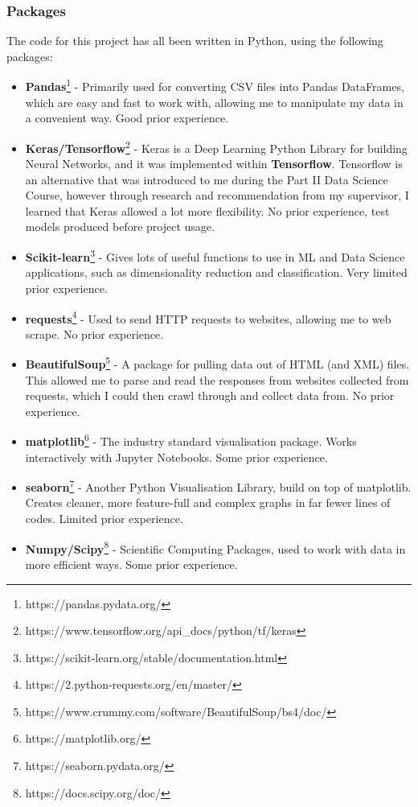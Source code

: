 \documentclass[12pt,a4paper,twoside,openright]{report}
\begin{document}
\subsubsection{Packages}

The code for this project has all been written in Python, using the following packages:

\begin{itemize}
    \item 
    {
    \textbf{Pandas}\footnote{https://pandas.pydata.org/} - Primarily used for converting CSV files into Pandas DataFrames, which are easy and fast to work with, allowing me to manipulate my data in a convenient way. Good prior experience.
    }
    \item
    {
    \textbf{Keras/Tensorflow}\footnote{https://www.tensorflow.org/api\_docs/python/tf/keras} - Keras is a Deep Learning Python Library for building Neural Networks, and it was implemented within \textbf{Tensorflow}. Tensorflow is an alternative that was introduced to me during the Part II Data Science Course, however through research and recommendation from my supervisor, I learned that Keras allowed a lot more flexibility. No prior experience, test models produced before project usage.
    }
    \item
    {
    \textbf{Scikit-learn}\footnote{https://scikit-learn.org/stable/documentation.html} - Gives lots of useful functions to use in ML and Data Science applications, such as dimensionality reduction and classification. Very limited prior experience.
    }
    \item
    {
    \textbf{requests}\footnote{https://2.python-requests.org/en/master/} - Used to send HTTP requests to websites, allowing me to web scrape. No prior experience.
    }
    \item
    {
    \textbf{BeautifulSoup}\footnote{https://www.crummy.com/software/BeautifulSoup/bs4/doc/} - A package for pulling data out of HTML (and XML) files. This allowed me to parse and read the responses from websites collected from requests, which I could then crawl through and collect data from. No prior experience.
    }
    \item
    {
    \textbf{matplotlib}\footnote{https://matplotlib.org/} - The industry standard visualisation package. Works interactively with Jupyter Notebooks. Some prior experience.
    }
    \item
    {
    \textbf{seaborn}\footnote{https://seaborn.pydata.org/} - Another Python Visualisation Library, build on top of matplotlib. Creates cleaner, more feature-full and complex graphs in far fewer lines of codes. Limited prior experience.
    }
    \item
    {
    \textbf{Numpy/Scipy}\footnote{https://docs.scipy.org/doc/} - Scientific Computing Packages, used to work with data in more efficient ways. Some prior experience.
    }
\end{itemize}
\end{document}
